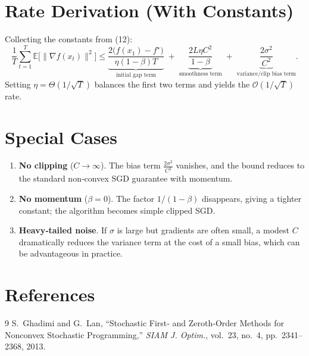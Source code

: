 \documentclass{article}
\newcommand{\E}{\mathbb{E}}
\begin{document}
\section*{Rate Derivation (With Constants)}
Collecting the constants from (12):
\[
\boxed{
\frac{1}{T}\sum_{t=1}^{T}\E\bigl[\|\nabla f(x_t)\|^2\bigr]
\le
\underbrace{\frac{2\bigl(f(x_1)-f^\star\bigr)}{\eta (1-\beta) T}}_{\text{initial gap term}}
\;+\;
\underbrace{\frac{2L\eta C^2}{1-\beta}}_{\text{smoothness term}}
\;+\;
\underbrace{\frac{2\sigma^2}{C^2}}_{\text{variance/clip bias term}} .
}
\]
Setting $\eta = \Theta(1/\sqrt{T})$ balances the first two terms and yields the $\mathcal O(1/\sqrt{T})$ rate.

\section*{Special Cases}
\begin{enumerate}
\item \textbf{No clipping} ($C\to\infty$). The bias term $\frac{2\sigma^2}{C^2}$ vanishes, and the bound reduces to the standard non‑convex SGD guarantee with momentum.
\item \textbf{No momentum} ($\beta=0$). The factor $1/(1-\beta)$ disappears, giving a tighter constant; the algorithm becomes simple clipped SGD.
\item \textbf{Heavy‑tailed noise}. If $\sigma$ is large but gradients are often small, a modest $C$ dramatically reduces the variance term at the cost of a small bias, which can be advantageous in practice.
\end{enumerate}

\section*{References}
\begin{thebibliography}{9}
S.~Ghadimi and G.~Lan, ``Stochastic First‑ and Zeroth‑Order Methods for Nonconvex Stochastic Programming,'' \emph{SIAM J. Optim.}, vol.~23, no.~4, pp.~2341–2368, 2013.
\end{thebibliography}
\end{document}
